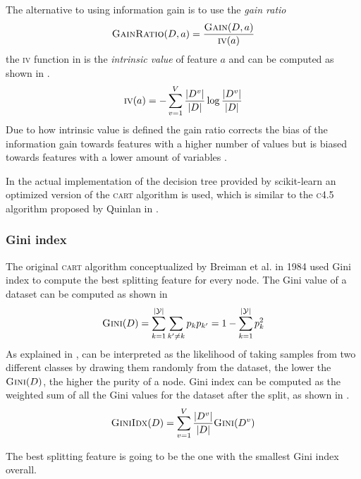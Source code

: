The alternative to using information gain is to use the \emph{gain ratio}
\begin{equation}
	\label{eq:gain-ratio}
	\textsc{GainRatio}(D, a) = \frac{\textsc{Gain}(D, a)}{\textsc{iv}(a)}
\end{equation}
the \textsc{iv} function in  is the \emph{intrinsic value} of feature $a$ and
can be computed as shown in .
\begin{equation}
	\label{eq:intrinsic-value}
	\textsc{iv}(a) = - \sum_{v = 1}^V\frac{|D^v|}{|D|} \log{\frac{|D^v|}{|D|}}
\end{equation}
Due to how intrinsic value is defined the gain ratio corrects the bias of the information gain towards features
with a higher number of values but is biased towards features with a lower amount of variables
\cite{ZhouZhi-Hua2021ML}.

In the actual implementation of the decision tree provided by scikit-learn an optimized version of
the \textsc{cart} algorithm is used, which  is similar to the \textsc{c4.5} algorithm proposed by Quinlan in
\cite{quinlan2014c4}.

\subsubsection{Gini index}
The original \textsc{cart} algorithm conceptualized by Breiman et al. in 1984
\cite{breiman1984classification} used Gini index to compute the best splitting feature for every
node. The Gini value of a dataset can be computed as shown in 
\begin{equation}
	\label{eq:gini-value}
	\textsc{Gini}(D) = \sum_{k = 1}^{|\mathcal{Y}|}\sum_{k' \neq k} p_kp_{k'} = 1 - \sum_{k =
		1}^{|\mathcal{Y}|}p_k^2
\end{equation}
As explained in \cite{ZhouZhi-Hua2021ML},  can be interpreted as the
likelihood of taking samples from two different classes by drawing them randomly from the
dataset, the lower the $\textsc{Gini}(D)$, the higher the purity of a node. Gini index can be
computed as the weighted sum of all the Gini values for the dataset after the split, as shown in
.
\begin{equation}
	\label{eq:gini-index}
	\textsc{GiniIdx}(D) = \sum_{v = 1}^V\frac{|D^v|}{|D|} \textsc{Gini}(D^v)
\end{equation}

The best splitting feature is going to be the one with the smallest Gini index overall.

